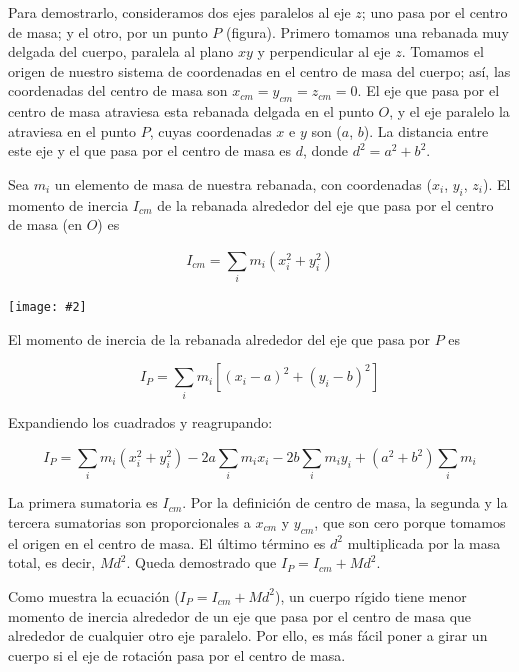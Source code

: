 \documentclass{article}
\newcommand{\ladoALado}[4]{
    \begin{minipage}[t]{#3\textwidth}
        \vspace{0pt}
        #1
    \end{minipage}
    \hfill
    \begin{minipage}[t]{#4\textwidth}
        \vspace{0pt}
        \centering
        \texttt{[image: \#2]}
    \end{minipage}
}
\begin{document}
    \ladoALado{
        \par Para demostrarlo, consideramos dos ejes paralelos al eje $z$; uno pasa por el centro de masa; y el otro, por un punto $P$ (figura). Primero tomamos una rebanada muy delgada del cuerpo, paralela al plano $xy$ y perpendicular al eje $z$. Tomamos el origen de nuestro sistema de coordenadas en el centro de masa del cuerpo; así, las coordenadas del centro de masa son $x_{cm} = y_{cm} = z_{cm} = 0$. El eje que pasa por el centro de masa atraviesa esta rebanada delgada en el punto $O$, y el eje paralelo la atraviesa en el punto $P$, cuyas coordenadas $x$ e $y$ son ($a$, $b$). La distancia entre este eje y el que pasa por el centro de masa es $d$, donde $d^2 = a^2 + b^2$.
        \par Sea $m_i$ un elemento de masa de nuestra rebanada, con coordenadas ($x_i$, $y_i$, $z_i$). El momento de inercia $I_{cm}$ de la rebanada alrededor del eje que pasa por el centro de masa (en $O$) es

        \[ I_{cm} = \sum_{i}^{} m_i (x_i^2 + y_i^2) \]

    }{img/8.5-1.png}{0.65}{0.35}

    \pagebreak

    \noindent El momento de inercia de la rebanada alrededor del eje que pasa por $P$ es

    \[ I_{P} = \sum_{i}^{} m_i \left[ (x_i - a)^2 + (y_i - b)^2 \right]  \]

    \noindent Expandiendo los cuadrados y reagrupando:

    \[ I_{P} = \sum_{i}^{} m_i (x_i^2 + y_i^2) - 2 a \sum_{i}^{} m_i x_i - 2 b \sum_{i}^{} m_i y_i + (a^2 + b^2) \sum_{i}^{} m_i\]

    \par La primera sumatoria es $I_{cm}$. Por la deﬁnición de centro de masa, la segunda y la tercera sumatorias son proporcionales a $x_{cm}$ y $y_{cm}$, que son cero porque tomamos el origen en el centro de masa. El último término es $d^2$ multiplicada por la masa total, es decir, $M d^2$. Queda demostrado que $I_P = I_{cm} + M d^2$.

    \vspace{0.5cm}

    \par Como muestra la ecuación ($I_P = I_{cm} + M d^2$), un cuerpo rígido tiene menor momento de inercia alrededor de un eje que pasa por el centro de masa que alrededor de cualquier otro eje paralelo. Por ello, es más fácil poner a girar un cuerpo si el eje de rotación pasa por el centro de masa.
\end{document}
